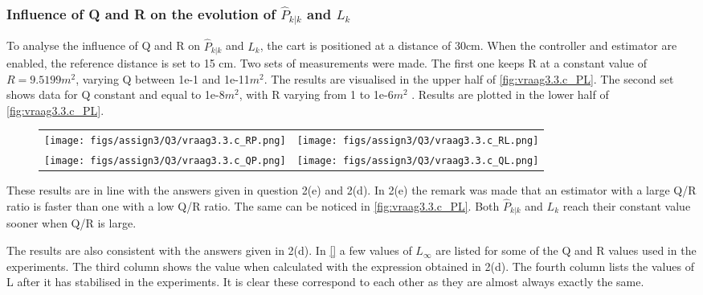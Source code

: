 \documentclass[a4paper]{article}
\newcommand{\newpar}{\vspace{.3cm}\noindent}
\begin{document}
\subsubsection{Influence of Q and R on the evolution of \(\hat{P}_{k|k}\) and \(L_{k}\)}
To analyse the influence of Q and R on \(\hat{P}_{k|k}\) and \(L_{k}\), the cart is positioned at a distance of 30cm. When the controller and estimator are enabled, the reference distance is set to 15 cm. Two sets of measurements were made. The first one keeps R at a constant value of \(R=9.5199m^2\), varying Q between 1e-1 and 1e-11\(m^2\). The results are visualised in the upper half of \autoref{fig:vraag3.3.c_PL}. The second set shows data for Q constant and equal to 1e-8\(m^2\), with R varying from 1 to 1e-6\(m^2\) . Results are plotted in the lower half of \autoref{fig:vraag3.3.c_PL}.

\begin{figure}[H]
\begin{adjustwidth}{-3cm}{-3cm}
\centering
\begin{tabular}{cc}
  \texttt{[image: figs/assign3/Q3/vraag3.3.c\_RP.png]} &   \texttt{[image: figs/assign3/Q3/vraag3.3.c\_RL.png]} \\
  
  \texttt{[image: figs/assign3/Q3/vraag3.3.c\_QP.png]} & \texttt{[image: figs/assign3/Q3/vraag3.3.c\_QL.png]} \\
\end{tabular}
\end{adjustwidth}
\label{fig:vraag3.3.c_PL}
\end{figure}

\newpar
These results are in line with the answers given in question 2(e) and 2(d). In 2(e) the remark was made that an estimator with a large Q/R ratio is faster than one with a low Q/R ratio. The same can be noticed in \autoref{fig:vraag3.3.c_PL}. Both \(\hat{P}_{k|k}\) and \(L_{k}\) reach their constant value sooner when Q/R is large. 

\newpar
The results are also consistent with the answers given in 2(d).
In \autoref{} a few values of \(L_\infty\) are listed for some of the Q and R values used in the experiments. The third column shows the value when calculated with the expression obtained in 2(d). The fourth column lists the values of L after it has stabilised in the experiments. It is clear these correspond to each other as they are almost always exactly the same.
\end{document}
